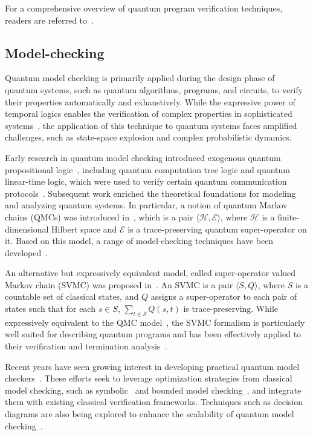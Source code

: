 \documentclass[a4paper,onecolumn,11pt,unpublished]{quantumarticle}
\begin{document}
For a comprehensive overview of quantum program verification techniques, readers are referred to~\cite{ying2024foundations, Lewis2023formal}.

\subsection{Model-checking}

Quantum model checking is primarily applied during the design phase of quantum systems, such as quantum algorithms, programs, and circuits, to verify their properties automatically and exhaustively. While the expressive power of temporal logics enables the verification of complex properties in sophisticated systems~\cite{BaierPrinciples2008,clarke1997model}, the application of this technique to quantum systems faces amplified challenges, such as state-space explosion and complex probabilistic dynamics.

Early research in quantum model checking introduced exogenous quantum propositional logic~\cite{MateusTemporal2009}, including quantum computation tree logic and quantum linear-time logic, which were used to verify certain quantum communication protocols~\cite{Gay_Nagarajan_Papanikolaou_2009}. Subsequent work enriched the theoretical foundations for modeling and analyzing quantum systems. 
In particular, a notion of quantum Markov chains (QMCs) was introduced in~\cite{Ying2013ReachProb}, which is a pair $\langle \mathcal{H}, \mathcal{E}\rangle$, where $\mathcal{H}$ is a finite-dimensional Hilbert space and $\mathcal{E}$ is a trace-preserving quantum super-operator on it. Based on this model, a range of model-checking techniques have been developed~\cite{Ying2014modelLT,Guan2024Measurement,Li2015QMC}. 

An alternative but expressively equivalent model, called super-operator valued Markov chain (SVMC) was proposed in~\cite{FengModel2013}. An SVMC is a pair $\langle S, Q\rangle$, where $S$ is a countable set of classical states, and $Q$ 
assigns a super-operator to each pair of states such that for each $s \in S$, $\sum_{t \in S} Q(s, t)$ is trace-preserving. While expressively equivalent to the QMC model~\cite{Li2015QMC}, the SVMC formalism is particularly well suited for describing quantum programs and has been effectively applied to their verification and termination analysis~\cite{FengModel2013,feng2017model,Feng2013reachRecur}.
 
 Recent years have seen growing interest in developing practical quantum model checkers~\cite{Fengqpmc2015, Daiqreach2024, do2024symbolic, Guan2024Measurement}. These efforts seek to leverage optimization strategies from classical model checking, such as symbolic~\cite{McMillan_1993_sym} and bounded model checking~\cite{biere2021bounded}, and integrate them with existing classical verification frameworks. Techniques such as decision diagrams are also being explored to enhance the scalability of quantum model checking~\cite{Lukas2020Improved,Daiqreach2024}.
\end{document}
